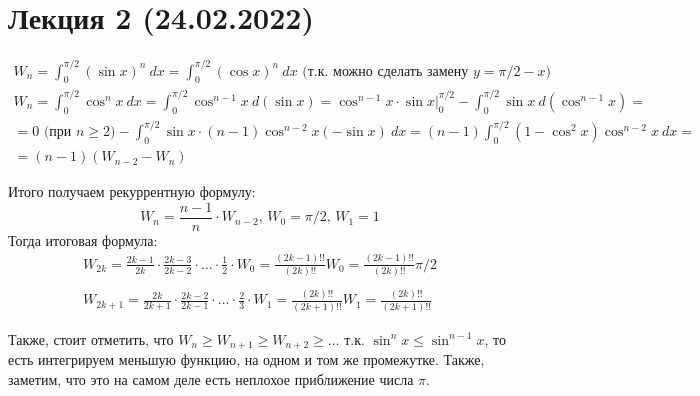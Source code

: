 \section*{Лекция 2 (24.02.2022)}

\begin{example}
 \[
     \begin{gathered}
         W_n = \int_0^{\pi / 2}{(\sin{x})^n}\ dx = \int_0^{\pi / 2}{(\cos{x})^n}\ dx 
          \text{ (т.к. можно сделать замену $y = \pi / 2 - x$)}
         \\
         W_n = \int_0^{\pi / 2}\cos^n{x}\ dx = \int_0^{\pi / 2}\cos^{n - 1}{x}\ d(\sin{x}) =
         \cos^{n - 1}{x} \cdot \sin{x} \bigg|_{0}^{\pi/2} - \int_{0}^{\pi / 2}\sin{x}\ d(\cos^{n - 1}{x}) = \\
         = 0 \text{ (при $n \geqslant 2$)} - \int_0^{\pi / 2} \sin{x} \cdot (n - 1) \cos^{n - 2}{x}(-\sin{x})\ dx =
         (n - 1)\int_{0}^{\pi / 2}(1 - \cos^2{x}) \cos^{n - 2}{x}\ dx =\\ 
         = (n - 1)(W_{n - 2} - W_{n})
     \end{gathered}
\]

Итого получаем рекуррентную формулу:
\[
    W_n = \frac{n - 1}{n} \cdot W_{n - 2}, \, W_0 = \pi / 2, \, W_1 = 1
\]
Тогда итоговая формула:
\[
    \begin{gathered}
        W_{2k} = \frac{2k - 1}{2k} \cdot \frac{2k - 3}{2k - 2} \cdot \ldots \cdot \frac{1}{2} \cdot W_0 =
        \frac{(2k - 1)!!}{(2k)!!} W_0 = \frac{(2k - 1)!!}{(2k)!!} \pi / 2
        \\\\
        W_{2k + 1} = \frac{2k}{2k + 1} \cdot \frac{2k - 2}{2k - 1} \cdot \ldots \cdot \frac{2}{3} \cdot W_1 =
        \frac{(2k)!!}{(2k + 1)!!} W_1 = \frac{(2k)!!}{(2k + 1)!!} 
    \end{gathered}
\]

Также, стоит отметить, что $W_n \geqslant W_{n + 1} \geqslant W_{n + 2} \geqslant \dots$ т.к.
$\sin^n{x} \leqslant \sin^{n - 1}{x}$, то есть интегрируем меньшую функцию, на одном и том же промежутке.
Также, заметим, что это на самом деле есть неплохое приближение числа $\pi$.\\


\end{example}
